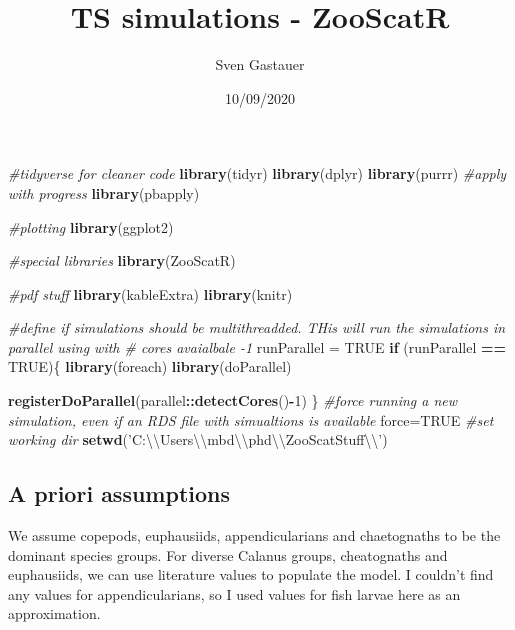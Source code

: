 \documentclass[
]{article}
\title{TS simulations - ZooScatR}
\author{Sven Gastauer}
\date{10/09/2020}
\newenvironment{Shaded}{\begin{snugshade}}{\end{snugshade}}
\newcommand{\CharTok}[1]{\textcolor[rgb]{0.31,0.60,0.02}{#1}}
\newcommand{\CommentTok}[1]{\textcolor[rgb]{0.56,0.35,0.01}{\textit{#1}}}
\newcommand{\ControlFlowTok}[1]{\textcolor[rgb]{0.13,0.29,0.53}{\textbf{#1}}}
\newcommand{\DecValTok}[1]{\textcolor[rgb]{0.00,0.00,0.81}{#1}}
\newcommand{\KeywordTok}[1]{\textcolor[rgb]{0.13,0.29,0.53}{\textbf{#1}}}
\newcommand{\NormalTok}[1]{#1}
\newcommand{\OperatorTok}[1]{\textcolor[rgb]{0.81,0.36,0.00}{\textbf{#1}}}
\newcommand{\OtherTok}[1]{\textcolor[rgb]{0.56,0.35,0.01}{#1}}
\newcommand{\StringTok}[1]{\textcolor[rgb]{0.31,0.60,0.02}{#1}}
\begin{document}
\maketitle

\begin{Shaded}
\begin{Highlighting}[]
\CommentTok{#tidyverse for cleaner code}
\KeywordTok{library}\NormalTok{(tidyr)}
\KeywordTok{library}\NormalTok{(dplyr)}
\KeywordTok{library}\NormalTok{(purrr)}
\CommentTok{#apply with progress}
\KeywordTok{library}\NormalTok{(pbapply)}

\CommentTok{#plotting}
\KeywordTok{library}\NormalTok{(ggplot2)}

\CommentTok{#special libraries}
\KeywordTok{library}\NormalTok{(ZooScatR)}

\CommentTok{#pdf stuff}
\KeywordTok{library}\NormalTok{(kableExtra)}
\KeywordTok{library}\NormalTok{(knitr)}

\CommentTok{#define if simulations should be multithreadded. THis will run the simulations in parallel using with # cores avaialbale -1}
\NormalTok{runParallel =}\StringTok{ }\OtherTok{TRUE}
\ControlFlowTok{if}\NormalTok{ (runParallel }\OperatorTok{==}\StringTok{ }\OtherTok{TRUE}\NormalTok{)\{}
  \KeywordTok{library}\NormalTok{(foreach)}
  \KeywordTok{library}\NormalTok{(doParallel)}
  
  \KeywordTok{registerDoParallel}\NormalTok{(parallel}\OperatorTok{::}\KeywordTok{detectCores}\NormalTok{()}\OperatorTok{-}\DecValTok{1}\NormalTok{)}
\NormalTok{\}}
\CommentTok{#force running a new simulation, even if an RDS file with simualtions is available}
\NormalTok{force=}\OtherTok{TRUE}
\CommentTok{#set working dir}
\KeywordTok{setwd}\NormalTok{(}\StringTok{'C:}\CharTok{\textbackslash{}\textbackslash{}}\StringTok{Users}\CharTok{\textbackslash{}\textbackslash{}}\StringTok{mbd}\CharTok{\textbackslash{}\textbackslash{}}\StringTok{phd}\CharTok{\textbackslash{}\textbackslash{}}\StringTok{ZooScatStuff}\CharTok{\textbackslash{}\textbackslash{}}\StringTok{'}\NormalTok{)}
\end{Highlighting}
\end{Shaded}

\hypertarget{a-priori-assumptions}{%
\subsection{A priori assumptions}\label{a-priori-assumptions}}

We assume copepods, euphausiids, appendicularians and chaetognaths to be
the dominant species groups. For diverse Calanus groups, cheatognaths
and euphausiids, we can use literature values to populate the model. I
couldn't find any values for appendicularians, so I used values for fish
larvae here as an approximation.
\end{document}
